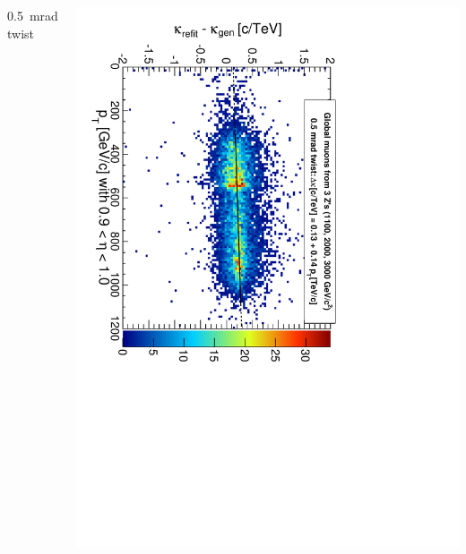 \documentclass[compress]{beamer}
\begin{document}
\begin{frame}
\begin{columns}
\begin{center}
0.5~mrad twist
\end{center}
\includegraphics[height=\linewidth, angle=90]{curvbias_vspt_twist0_5mrad_GlobalMuons2.pdf}
\end{columns}
\end{frame}
\end{document}
